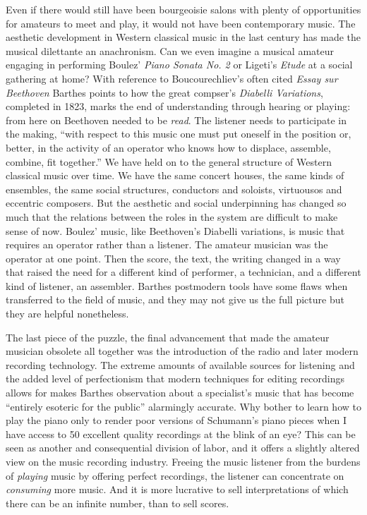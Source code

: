 \documentclass[11pt]{article}
\begin{document}
Even if there would still have been bourgeoisie salons with plenty of opportunities for amateurs to meet and play, it would not have been contemporary music. The aesthetic development in Western classical music in the last century has made the musical dilettante an anachronism. Can we even imagine a musical amateur engaging in performing Boulez' \emph{Piano Sonata No. 2} or Ligeti's \emph{Etude} at a social gathering at home? With reference to Boucourechliev's often cited \emph{Essay sur Beethoven} Barthes points to how the great compser's \emph{Diabelli Variations}, completed in 1823, marks the end of understanding through hearing or playing: from here on Beethoven needed to be \emph{read}. The listener needs to participate in the making, ``with respect to this music one must put oneself in the position or, better, in the activity of an operator who knows how to displace, assemble, combine, fit together.''  \citep[p.153]{barthes77} We have held on to the general structure of Western classical music over time. We have the same concert houses, the same kinds of ensembles, the same social structures, conductors and soloists, virtuousos and eccentric composers. But the aesthetic and social underpinning has changed so much that the relations between the roles in the system are difficult to make sense of now. Boulez' music, like Beethoven's Diabelli variations, is music that requires an operator rather than a listener. The amateur musician was the operator at one point. Then the score, the text, the writing changed in a way that raised the need for a different kind of performer, a technician, and a different kind of listener, an assembler. Barthes postmodern tools have some flaws when transferred to the field of music, and they may not give us the full picture but they are helpful nonetheless.

The last piece of the puzzle, the final advancement that made the amateur musician obsolete all together was the introduction of the radio and later modern recording technology. The extreme amounts of available sources for listening and the added level of perfectionism that modern techniques for editing recordings allows for makes Barthes observation about a specialist's music that has become ``entirely esoteric for the public'' alarmingly accurate. Why bother to learn how to play the piano only to render poor versions of Schumann's piano pieces when I have access to 50 excellent quality recordings at the blink of an eye? This can be seen as another and consequential division of labor, and it offers a slightly altered view on the music recording industry. Freeing the music listener from the burdens of \emph{playing} music by offering perfect recordings, the listener can concentrate on \emph{consuming} more music. And it is more lucrative to sell interpretations of which there can be an infinite number, than to sell scores.
\end{document}
